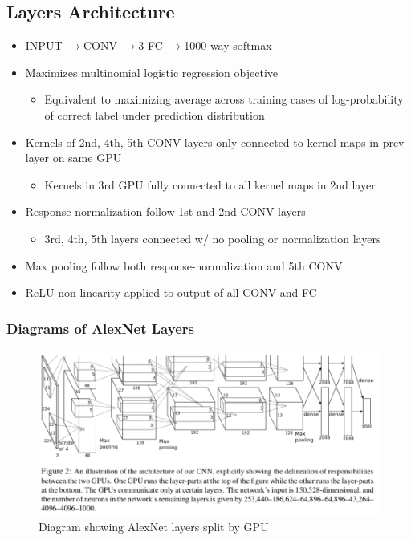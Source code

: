 \documentclass[a4paper,12pt]{article}
\newcommand{\lra}{\ensuremath{\longrightarrow{}}}
\begin{document}
\subsection{Layers Architecture}
\begin{itemize}
  \item INPUT \lra CONV \lra 3 FC \lra 1000-way softmax
  \item Maximizes multinomial logistic regression objective
  \begin{itemize}
    \item Equivalent to maximizing average across training cases of log-probability of correct label under prediction distribution
  \end{itemize}
  \item Kernels of 2nd, 4th, 5th CONV layers only connected to kernel maps in prev layer on same GPU
  \begin{itemize}
    \item Kernels in 3rd GPU fully connected to all kernel maps in 2nd layer
  \end{itemize}
  \item Response-normalization follow 1st and 2nd CONV layers
  \begin{itemize}
    \item 3rd, 4th, 5th layers connected w/ no pooling or normalization layers
  \end{itemize}
  \item Max pooling follow both response-normalization and 5th CONV
  \item ReLU non-linearity applied to output of all CONV and FC
\end{itemize}

\pagebreak

\subsubsection{Diagrams of AlexNet Layers}

\begin{figure}[htp]
  \centering
  \includegraphics[width=140mm, scale=0.75]{images/AlexNet-GPU-Structure.png}
  \caption{Diagram showing AlexNet layers split by GPU}
  \label{AlexNet-Struct}
\end{figure}
\end{document}
